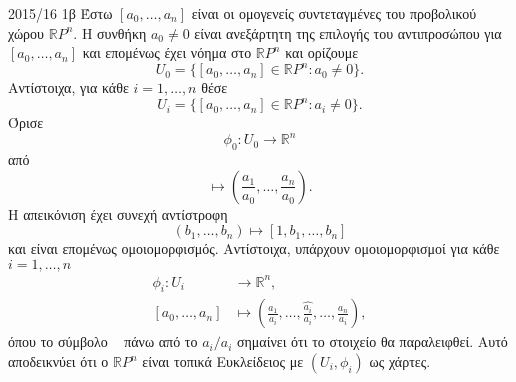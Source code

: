\documentclass[a4paper,11pt]{article}
\begin{document}
\begin{solution}{2015/16 1β}
    Έστω \( [a_0, \dots, a_n] \) είναι οι ομογενείς συντεταγμένες του
    προβολικού χώρου \( \mathbb{R}P^n \). Η συνθήκη \( a_0 \neq 0 \) είναι
    ανεξάρτητη της επιλογής του αντιπροσώπου για \( [a_0, \dots, a_n] \) και
    επομένως έχει νόημα στο \( \mathbb{R}P^n \) και ορίζουμε
    \begin{equation*}
        U_0 = \{ [a_0, \dots, a_n] \in \mathbb{R}P^n: a_0 \neq 0 \}.
    \end{equation*}
    Αντίστοιχα, για κάθε \( i = 1, \dots, n \) θέσε
    \begin{equation*}
        U_i = \{ [a_0, \dots, a_n] \in \mathbb{R}P^n: a_i \neq 0 \}.
    \end{equation*}
    Όρισε
    \begin{equation*}
        \phi_0: U_0 \to \mathbb{R}^n
    \end{equation*}
    από
    \begin{equation*}
        [a_0, \dots, a_n] \mapsto \left( \frac{a_1}{a_0}, \dots,
        \frac{a_n}{a_0} \right).
    \end{equation*}
    Η απεικόνιση έχει συνεχή αντίστροφη
    \begin{equation*}
        (b_1, \dots, b_n) \mapsto [1, b_1, \dots, b_n]
    \end{equation*}
    και είναι επομένως ομοιομορφισμός. Αντίστοιχα, υπάρχουν ομοιομορφισμοί για
    κάθε \( i = 1, \dots, n \)
    \begin{align*}
        \phi_i: U_i &\to \mathbb{R}^n,\\
        [a_0, \dots, a_n] &\mapsto \left( \frac{a_1}{a_i}, \dots,
        \widehat{\frac{a_i}{a_i}}, \dots,\frac{a_n}{a_i} \right),
    \end{align*}
    όπου το σύμβολο \( \, \widehat{\,} \, \) πάνω από το \( a_i/a_i \) σημαίνει ότι το
    στοιχείο θα παραλειφθεί. Αυτό αποδεικνύει ότι ο \( \mathbb{R}P^n \) είναι
    τοπικά Ευκλείδειος με \( (U_i, \phi_i) \) ως χάρτες.


\end{solution}
\end{document}
